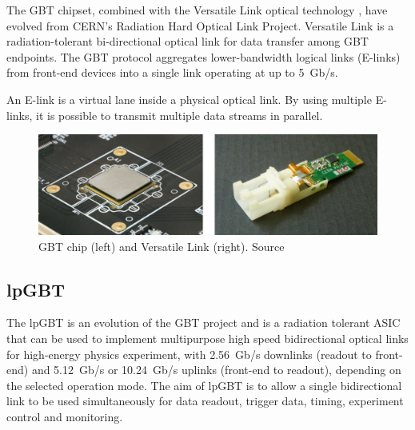The \ac{GBT} chipset, combined with the Versatile Link optical technology \cite{gbt-versatile-link}, have evolved from \ac{CERN}'s Radiation Hard Optical Link Project. Versatile Link is a radiation-tolerant bi-directional optical link for data transfer among \acs{GBT} endpoints. The \ac{GBT} protocol aggregates lower-bandwidth logical links (\acs{E-link}s) from front-end devices into a single link operating at up to 5~Gb/s.

\begin{definition}
\label{def:elink}
An \acs{E-link} is a virtual lane inside a physical optical link. By using multiple \acs{E-link}s, it is possible to transmit multiple data streams in parallel.
\end{definition}

\begin{figure}[H]
\centering
\includegraphics[width=\textwidth]{images/felix/gbt.jpg}
\caption[GBT and Versatile Link]{\acs{GBT} chip (left) and Versatile Link (right). Source \protect\cite{gbt-versatile-link}}
\label{fig:gbt-versalink-combined}
\end{figure}

\subsection{\acf{lpGBT}}
\label{subsec:felix-lpgbt}

The \acf{lpGBT} \cite{lpgbt} is an evolution of the \acf{GBT} project and is a radiation tolerant \acs{ASIC} that can be used to implement multipurpose high speed bidirectional optical links for high-energy physics experiment, with 2.56~Gb/s downlinks (readout to front-end) and 5.12~Gb/s or 10.24~Gb/s uplinks (front-end to readout), depending on the selected operation mode. The aim of \acs{lpGBT} is to allow a single bidirectional link to be used simultaneously for data readout, trigger data, timing, experiment control and monitoring.

